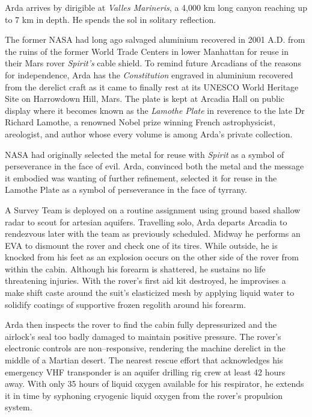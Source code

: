 Arda arrives by dirigible at {\it Valles Marineris}, a 4,000 km long canyon reaching up to 7 km in depth. He spends the sol in solitary reflection.

The former NASA had long ago salvaged aluminium recovered in 2001 A.D. from the ruins of the former World Trade Centers in lower Manhattan for reuse in their Mars rover {\it Spirit's} cable shield. To remind future Arcadians of the reasons for independence, Arda has the {\it Constitution} engraved in aluminium recovered from the derelict craft as it came to finally rest at its UNESCO World Heritage Site on Harrowdown Hill, Mars. The plate is kept at Arcadia Hall on public display where it becomes known as the {\it Lamothe Plate} in reverence to the late Dr Richard Lamothe, a renowned Nobel prize winning French astrophysicist, areologist, and author whose every volume is among Arda's private collection.

NASA had originally selected the metal for reuse with {\it Spirit} as a symbol of perseverance in the face of evil. Arda, convinced both the metal and the message it embodied was wanting of further refinement, selected it for reuse in the Lamothe Plate as a symbol of perseverance in the face of tyrrany.
\StopTimelineDate

A Survey Team is deployed on a routine assignment using ground based shallow radar to scout for artesian aquifers. Travelling solo, Arda departs Arcadia to rendezvous later with the team as previously scheduled. Midway he performs an EVA to dismount the rover and check one of its tires. While outside, he is knocked from his feet as an explosion occurs on the other side of the rover from within the cabin. Although his forearm is shattered, he sustains no life threatening injuries. With the rover's first aid kit destroyed, he improvises a make shift caste around the suit's elasticized mesh by applying liquid water to solidify coatings of supportive frozen regolith around his forearm.

Arda then inspects the rover to find the cabin fully depressurized and the airlock's seal too badly damaged to maintain positive pressure. The rover's electronic controls are non--responsive, rendering the machine derelict in the middle of a Martian desert. The nearest rescue effort that acknowledges his emergency VHF transponder is an aquifer drilling rig crew at least 42 hours away. With only 35 hours of liquid oxygen available for his respirator, he extends it in time by syphoning cryogenic liquid oxygen from the rover's propulsion system.

